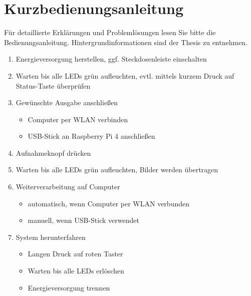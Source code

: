 \documentclass[./00PhotoBox.tex]{subfiles}
\begin{document}
\chapter{Kurzbedienungsanleitung}

Für detaillierte Erklärungen und Problemlösungen lesen Sie bitte die Bedienungsanleitung. Hintergrundinformationen sind der Thesis zu entnehmen.


\begin{enumerate}
    \item Energieversorgung herstellen, ggf. Steckdosenleiste einschalten
    \item Warten bis alle LEDs grün aufleuchten, evtl. mittels kurzem Druck auf Status-Taste überprüfen
    \item Gewünschte Ausgabe anschließen
          \begin{itemize}
              \item Computer per WLAN verbinden
              \item USB-Stick an Raspberry Pi 4 anschließen
          \end{itemize}
    \item Aufnahmeknopf drücken
    \item Warten bis alle LEDs grün aufleuchten, Bilder werden übertragen
    \item Weiterverarbeitung auf Computer
          \begin{itemize}
              \item au\-to\-ma\-tisch, wenn Computer per WLAN verbunden
              \item manuell, wenn USB-Stick verwendet
          \end{itemize}
    \item System herunterfahren
          \begin{itemize}
              \item Langen Druck auf roten Taster
              \item Warten bis alle LEDs erlöschen
              \item Energieversorgung trennen
          \end{itemize}
\end{enumerate}
\end{document}

